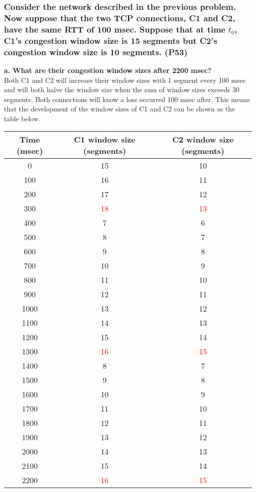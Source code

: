 \subsubsection{Consider the network described in the previous problem. Now suppose that the two TCP connections, C1 and C2, have the same RTT of 100 msec.  Suppose that at time $t_0$, C1's congestion window size is 15 segments but C2's congestion window size is 10 segments. (P53)}

\textbf{a. What are their congestion window sizes after 2200 msec?} \\
Both C1 and C2 will increase their window sizes with 1 segment every 100 msec and will both halve the window size when the sum of window sizes exceeds 30 segments. Both connections will know a loss occurred 100 msec after. This means that the development of the window sizes of C1 and C2 can be shown as the table below.
\begin{center}
  \begin{tabular}{ccc}
    \hline
    Time (msec) & C1 window size (segments) & C2 window size (segments) \\
    \hline
    0 & 15 & 10 \\
    100 & 16 & 11 \\
    200 & 17 & 12 \\
    300 & \textcolor{red}{18} & \textcolor{red}{13} \\
    400 & 7 & 6 \\
    500 & 8 & 7 \\
    600 & 9 & 8 \\
    700 & 10 & 9 \\
    800 & 11 & 10 \\
    900 & 12 & 11 \\
    1000 & 13 & 12 \\
    1100 & 14 & 13 \\
    1200 & 15 & 14 \\
    1300 & \textcolor{red}{16} & \textcolor{red}{15} \\
    1400 & 8 & 7 \\
    1500 & 9 & 8 \\
    1600 & 10 & 9 \\
    1700 & 11 & 10 \\
    1800 & 12 & 11 \\
    1900 & 13 & 12 \\
    2000 & 14 & 13 \\
    2100 & 15 & 14 \\
    2200 & \textcolor{red}{16} & \textcolor{red}{15} \\
    \hline
  \end{tabular}
\end{center}
